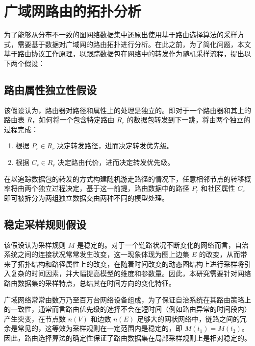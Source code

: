 \section{广域网路由的拓扑分析}

为了能够从分布不一致的图网络数据集中还原出使用基于路由选择算法的采样方式，需要基于数据对广域网的路由拓扑进行分析。在此之前，为了简化问题，本文基于路由协议工作原理，以跟踪数据包在网络中的转发作为随机采样流程，提出以下两个假设：

\subsection{路由属性独立性假设}

该假设认为，路由器对路径和属性上的处理是独立的。即对于一个路由器和其上的路由表 $R$，如何将一个包含特定路由 $R_r$ 的数据包转发到下一跳，将由两个独立的过程完成：

\begin{enumerate}
    \item 根据 $P_r \in R_r$ 决定转发路径，进而决定转发优先级。
    \item 根据 $C_r \in R_r$ 决定路由代价，进而决定转发优先级。
\end{enumerate}

在以追踪数据包的转发的方式构建随机游走路径的情况下，任意相邻节点的转移概率将由两个独立过程决定，基于这一前提，路由数据中的路径 $P_r$ 和社区属性 $C_r$ 即可被拆分为两组独立数据交由两种不同的模型处理。

\subsection{稳定采样规则假设}

该假设认为采样规则 $M$ 是稳定的。对于一个链路状况不断变化的网络而言，自治系统之间的连接状况常常发生改变，这一现象体现为图上边集 $E$ 的改变，从而带来了拓扑结构和路径属性上的改变，在随着时间改变的动态图结构上进行采样将引入复杂的时间因素，并大幅提高模型的维度和参数量。因此，本研究需要针对网络路由数据集的采样特点，总结其在时间方向的变化特征。

广域网络常常由数万乃至百万台网络设备组成，为了保证自治系统在其路由策略上的一致性，通常而言路由优先级的选择不会在短时间（例如路由异常的时间段内）产生突变，在节点数 $n(V)$ 和边数 $n(E)$ 足够大的网状网络中，链路之间的冗余是常见的，这等效为采样规则在一定范围内是稳定的，即 $M(t_1) = M(t_2)$。因此，路由选择算法的确定性保证了路由数据集在局部采样规则上是相对稳定的。
